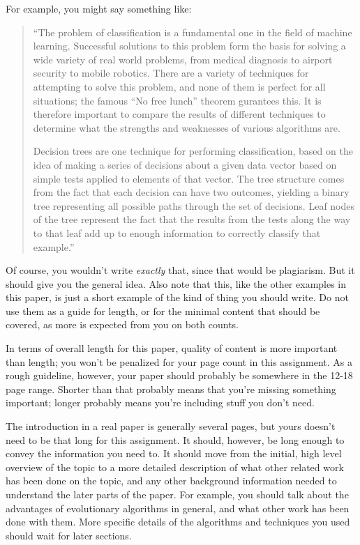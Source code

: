\documentclass[12pt, letterpaper]{article}
\begin{document}
For example, you might say something like: 
\begin{quote}  %
``The problem of classification is a fundamental one in the field of machine
learning.  Successful solutions to this problem form the basis for solving a wide
variety of real world problems, from medical diagnosis to airport security to
mobile robotics.  There are a variety of techniques for attempting to solve this
problem, and none of them is perfect for all situations; the famous ``No free
lunch'' theorem\cite{noFreeLunch} gurantees this.  It is therefore important to
compare the results of different techniques to determine what the strengths and
weaknesses of various algorithms are. 

Decision trees are one technique for performing classification, based on the
idea of making a series of decisions about a given data vector based on simple
tests applied to elements of that vector.  The tree structure comes from the
fact that each decision can have two outcomes, yielding a binary tree
representing all possible paths through the set of decisions.  Leaf nodes of the
tree represent the fact that the results from the tests along the way to that
leaf add up to enough information to correctly classify that example.''
\end{quote}

Of course, you wouldn't write \emph{exactly} that, since that would be
plagiarism.  But it should give you the general idea.  Also note that this, like
the other examples in this paper, is just a short example of the kind of thing
you should write.  Do not use them as a guide for length, or for the minimal
content that should be covered, as more is expected from you on both counts.

In terms of overall length for this paper, quality of content is more important
than length; you won't be penalized for your page count in this assignment.  As
a rough guideline, however, your paper should probably be somewhere in the 12-18
page range.  Shorter than that probably means that you're missing something
important; longer probably means you're including stuff you don't need.

The introduction in a real paper is generally several pages, but yours doesn't
need to be that long for this assignment.  It should, however, be long enough to
convey the information you need to.  It should move from the initial, high level
overview of the topic to a more detailed description of what other related work
has been done on the topic, and any other background information needed to
understand the later parts of the paper.  For example, you should talk about the
advantages of evolutionary algorithms in general, and what other work has been
done with them.  More specific details of the algorithms and techniques you used
should wait for later sections.
\end{document}
